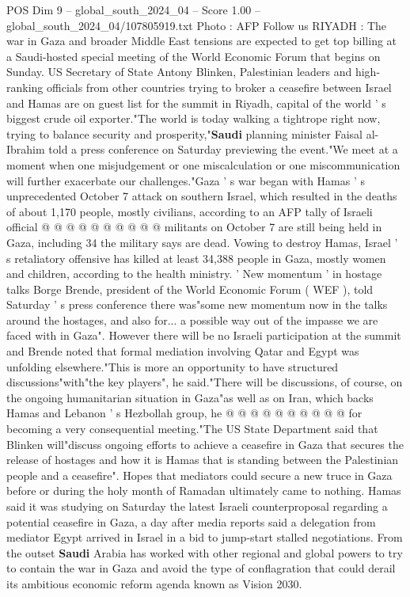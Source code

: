 \begin{textsample}{POS Dim 9 – global\_south\_2024\_04 – Score 1.00 – global\_south\_2024\_04/107805919.txt}
Photo : AFP Follow us RIYADH : The war in Gaza and broader Middle East tensions are expected to get top billing at a Saudi-hosted special meeting of the World Economic Forum that begins on Sunday.
US Secretary of State Antony Blinken, Palestinian leaders and high-ranking officials from other countries trying to broker a ceasefire between Israel and Hamas are on guest list for the summit in Riyadh, capital of the world ' s biggest crude oil exporter."The world is today walking a tightrope right now, trying to balance security and prosperity,"\textbf{Saudi} planning minister Faisal al-Ibrahim told a press conference on Saturday previewing the event."We meet at a moment when one misjudgement or one miscalculation or one miscommunication will further exacerbate our challenges."Gaza ' s war began with Hamas ' s unprecedented October 7 attack on southern Israel, which resulted in the deaths of about 1,170 people, mostly civilians, according to an AFP tally of Israeli official @ @ @ @ @ @ @ @ @ @ militants on October 7 are still being held in Gaza, including 34 the military says are dead.
Vowing to destroy Hamas, Israel ' s retaliatory offensive has killed at least 34,388 people in Gaza, mostly women and children, according to the health ministry. ' New momentum ' in hostage talks Borge Brende, president of the World Economic Forum ( WEF ), told Saturday ' s press conference there was"some new momentum now in the talks around the hostages, and also for... a possible way out of the impasse we are faced with in Gaza".
However there will be no Israeli participation at the summit and Brende noted that formal mediation involving Qatar and Egypt was unfolding elsewhere."This is more an opportunity to have structured discussions"with"the key players", he said."There will be discussions, of course, on the ongoing humanitarian situation in Gaza"as well as on Iran, which backs Hamas and Lebanon ' s Hezbollah group, he @ @ @ @ @ @ @ @ @ @ for becoming a very consequential meeting."The US State Department said that Blinken will"discuss ongoing efforts to achieve a ceasefire in Gaza that secures the release of hostages and how it is Hamas that is standing between the Palestinian people and a ceasefire".
Hopes that mediators could secure a new truce in Gaza before or during the holy month of Ramadan ultimately came to nothing.
Hamas said it was studying on Saturday the latest Israeli counterproposal regarding a potential ceasefire in Gaza, a day after media reports said a delegation from mediator Egypt arrived in Israel in a bid to jump-start stalled negotiations.
From the outset \textbf{Saudi} Arabia has worked with other regional and global powers to try to contain the war in Gaza and avoid the type of conflagration that could derail its ambitious economic reform agenda known as Vision 2030.

\end{textsample}

